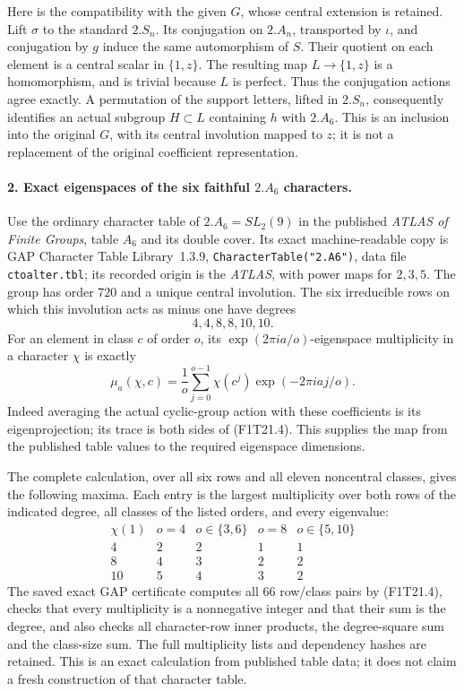 Here is the compatibility with the given $G$, whose
central extension is retained. Lift $\sigma$ to the
standard $2.S_n$. Its conjugation on $2.A_n$, transported
by $\iota$, and conjugation by $g$ induce the same
automorphism of $S$. Their quotient on each element
is a central scalar in $\{1,z\}$. The resulting map
$L\to\{1,z\}$ is a homomorphism, and is trivial
because $L$ is perfect. Thus the conjugation actions
agree exactly. A permutation of the support letters,
lifted in $2.S_n$, consequently identifies an actual
subgroup $H\subset L$ containing $h$ with $2.A_6$.
This is an inclusion into the original $G$, with its
central involution mapped to $z$; it is not a replacement
of the original coefficient representation.

\paragraph{2. Exact eigenspaces of the six faithful $2.A_6$ characters.}
Use the ordinary character table of $2.A_6=SL_2(9)$
in the published \emph{ATLAS of Finite Groups}, table
$A_6$ and its double cover. Its exact machine-readable
copy is GAP Character Table Library~1.3.9,
\texttt{CharacterTable("2.A6")}, data file
\texttt{ctoalter.tbl}; its recorded origin is the
\emph{ATLAS}, with power maps for $2,3,5$.
The group has order $720$ and a unique central
involution. The six irreducible rows on which this
involution acts as minus one have degrees
\[
                         4,4,8,8,10,10.
 \tag{F1T21.3}
\]
For an element in class $c$ of order $o$, its
$\exp(2\pi i a/o)$-eigenspace multiplicity in a
character $\chi$ is exactly
\[
 \mu_a(\chi,c)=\frac1o\sum_{j=0}^{o-1}
           \chi(c^j)\exp(-2\pi i aj/o).
 \tag{F1T21.4}
\]
Indeed averaging the actual cyclic-group action with
these coefficients is its eigenprojection; its trace
is both sides of (F1T21.4). This supplies the map
from the published table values to the required
eigenspace dimensions.

The complete calculation, over all six rows and all
eleven noncentral classes, gives the following maxima.
Each entry is the largest multiplicity over both rows
of the indicated degree, all classes of the listed
orders, and every eigenvalue:
\[
\begin{array}{c|rrrr}
 \chi(1)&o=4&o\in\{3,6\}&o=8&o\in\{5,10\}\\\hline
 4&2&2&1&1\\
 8&4&3&2&2\\
 10&5&4&3&2
\end{array}
 \tag{F1T21.5}
\]
The saved exact GAP certificate computes all $66$
row/class pairs by (F1T21.4), checks that every
multiplicity is a nonnegative integer and that their
sum is the degree, and also checks all character-row
inner products, the degree-square sum and the
class-size sum. The full multiplicity lists and
dependency hashes are retained. This is an exact
calculation from published table data; it does not
claim a fresh construction of that character table.

